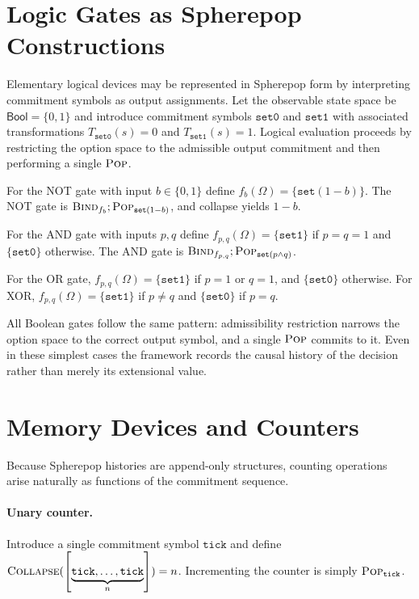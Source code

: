 \documentclass[12pt]{article}
\newcommand{\Pop}{\operatorname{\textsc{Pop}}}
\newcommand{\Bind}{\operatorname{\textsc{Bind}}}
\newcommand{\Collapse}{\operatorname{\textsc{Collapse}}}
\newcommand{\Option}{\Omega}
\newcommand{\Seq}[1]{\left[#1\right]}
\begin{document}
\section{Logic Gates as Spherepop Constructions}
\label{app:gates}

Elementary logical devices may be represented in Spherepop form by interpreting commitment symbols as output assignments. Let the observable state space be $\mathsf{Bool} = \{0,1\}$ and introduce commitment symbols $\mathtt{set0}$ and $\mathtt{set1}$ with associated transformations $T_{\mathtt{set0}}(s) = 0$ and $T_{\mathtt{set1}}(s) = 1$. Logical evaluation proceeds by restricting the option space to the admissible output commitment and then performing a single $\Pop$.

For the NOT gate with input $b \in \{0,1\}$ define $f_b(\Option) = \{\mathtt{set}(1-b)\}$. The NOT gate is $\Bind_{f_b} ; \Pop_{\mathtt{set}(1-b)}$, and collapse yields $1-b$.

For the AND gate with inputs $p,q$ define $f_{p,q}(\Option) = \{\mathtt{set1}\}$ if $p=q=1$ and $\{\mathtt{set0}\}$ otherwise. The AND gate is $\Bind_{f_{p,q}} ; \Pop_{\mathtt{set}(p\wedge q)}$.

For the OR gate, $f_{p,q}(\Option) = \{\mathtt{set1}\}$ if $p=1$ or $q=1$, and $\{\mathtt{set0}\}$ otherwise. For XOR, $f_{p,q}(\Option) = \{\mathtt{set1}\}$ if $p \neq q$ and $\{\mathtt{set0}\}$ if $p=q$.

All Boolean gates follow the same pattern: admissibility restriction narrows the option space to the correct output symbol, and a single $\Pop$ commits to it. Even in these simplest cases the framework records the causal history of the decision rather than merely its extensional value.

\section{Memory Devices and Counters}
\label{app:counters}

Because Spherepop histories are append-only structures, counting operations arise naturally as functions of the commitment sequence.

\paragraph{Unary counter.} Introduce a single commitment symbol $\mathtt{tick}$ and define $\Collapse(\Seq{\underbrace{\mathtt{tick},\dots,\mathtt{tick}}_{n}}) = n$. Incrementing the counter is simply $\Pop_{\mathtt{tick}}$.
\end{document}
